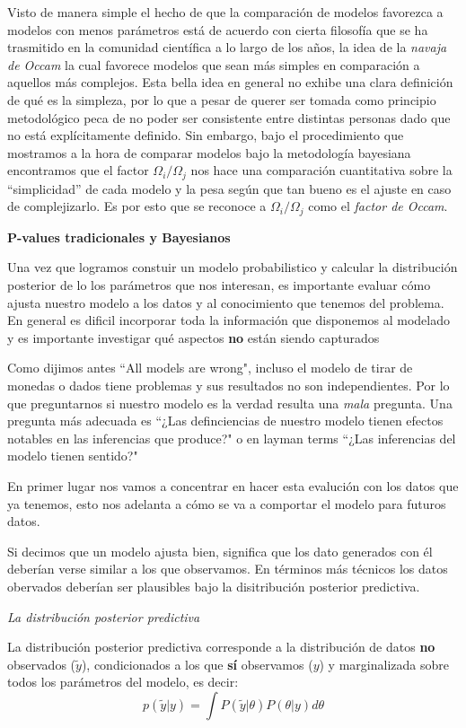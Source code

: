\documentclass[aps,onecolumn,12pt,notitlepage]{revtex4-2}
\begin{document}
Visto de manera simple el hecho de que la comparación de modelos favorezca a modelos con menos parámetros está de acuerdo con cierta filosofía que se ha trasmitido en la comunidad científica a lo largo de los años, la idea de la \textit{navaja de Occam} la cual favorece modelos que sean más simples en comparación a aquellos más complejos. Esta bella idea en general no exhibe una clara definición de qué es la simpleza, por lo que a pesar de querer ser tomada como principio metodológico peca de no poder ser consistente entre distintas personas dado que no está explícitamente definido. Sin embargo, bajo el procedimiento que mostramos a la hora de comparar modelos bajo la metodología bayesiana encontramos que el factor $\Omega_{i}/\Omega_{j}$ nos hace una comparación cuantitativa sobre la ``simplicidad'' de cada modelo y la pesa según que tan bueno es el ajuste en caso de complejizarlo. Es por esto que se reconoce a $\Omega_{i}/\Omega_{j}$ como el \textit{factor de Occam}.

\textbf{P-values tradicionales y Bayesianos}

Una vez que logramos constuir un modelo probabilistico y calcular la distribución posterior de lo los parámetros que nos interesan, es importante evaluar cómo ajusta nuestro modelo a los datos y al conocimiento que tenemos del problema. En general es dificil incorporar toda la información que disponemos al modelado y es importante investigar qué aspectos \textbf{no} están siendo capturados

Como dijimos antes ``All models are wrong", incluso el modelo de tirar de monedas o dados tiene problemas y sus resultados no son independientes. Por lo que preguntarnos si nuestro modelo es la verdad resulta una \textit{mala} pregunta. Una pregunta más adecuada es ``¿Las definciencias de nuestro modelo tienen efectos notables en las inferencias que produce?" o en layman terms ``¿Las inferencias del modelo tienen sentido?"

En primer lugar nos vamos a concentrar en hacer esta evalución con los datos que ya tenemos, esto nos adelanta a cómo se va a comportar el modelo para futuros datos.

Si decimos que un modelo ajusta bien, significa que los dato generados con él deberían verse similar a los que observamos. En términos más técnicos los datos obervados deberían ser plausibles bajo la disitribución posterior predictiva. 

\textit{
La distribución posterior predictiva}

La distribución posterior predictiva corresponde a la distribución de datos \textbf{no} observados ($\tilde{y}$), condicionados a los que \textbf{sí} observamos ($y$) y marginalizada sobre todos los parámetros del modelo, es decir:
\begin{equation}
p(\tilde{y}|y) = \int P(\tilde{y}|\theta) P(\theta|y) d\theta
\end{equation}
\end{document}
